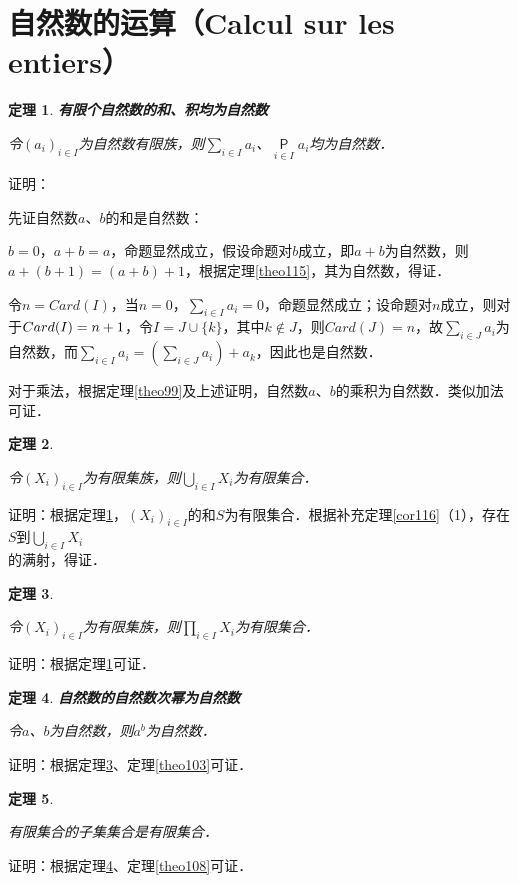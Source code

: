 \documentclass[12pt, a4paper, oneside]{book}
\newtheorem{theo}{定理}
\begin{document}
		\section{自然数的运算（Calcul sur les entiers）}		
			\begin{theo}\label{theo125}
				\textbf{有限个自然数的和、积均为自然数}
				\par
				令$(a_i)_{i\in I}$为自然数有限族，则$\sum\limits_{i\in I}a_i$、$\mathop{\mathsf{P}}\limits_{i\in I}a_i$均为自然数．
			\end{theo}
			证明：
			\par
			先证自然数$a$、$b$的和是自然数：
			\par
			$b=0$，$a+b=a$，命题显然成立，假设命题对$b$成立，即$a+b$为自然数，则$a+(b+1)=(a+b)+1$，根据定理\ref{theo115}，其为自然数，得证．
			\par
			令$n=Card(I)$，当$n=0$，$\sum\limits_{i\in I}a_i=0$，命题显然成立；设命题对$n$成立，则对于$Card(I)\\=n+1$，令$I=J\cup\{k\}$，其中$k\notin J$，则$Card(J)=n$，故$\sum\limits_{i\in J}a_i$为自然数，而$\sum\limits_{i\in I}a_i=(\sum\limits_{i\in J}a_i)+a_k$，因此也是自然数．
			\par
			对于乘法，根据定理\ref{theo99}及上述证明，自然数$a$、$b$的乘积为自然数．类似加法可证．				
						
			\begin{theo}\label{theo126}
				\hfill\par
				令$(X_i)_{i\in I}$为有限集族，则$\bigcup\limits_{i\in I}X_i$为有限集合．
			\end{theo}
			证明：根据定理\ref{theo125}，$(X_i)_{i\in I}$的和$S$为有限集合．根据补充定理\ref{cor116}（1），存在$S$到$\bigcup\limits_{i\in I}X_i$\\的满射，得证．
			
			\begin{theo}\label{theo127}
				\hfill\par
				令$(X_i)_{i\in I}$为有限集族，则$\prod\limits_{i\in I}X_i$为有限集合．
			\end{theo}
			证明：根据定理\ref{theo125}可证．
			
			\begin{theo}\label{theo128}
				\textbf{自然数的自然数次幂为自然数}
				\par
				令$a$、$b$为自然数，则$a^b$为自然数．
			\end{theo}
			证明：根据定理\ref{theo127}、定理\ref{theo103}可证．
			
			\begin{theo}\label{theo129}
				\hfill\par
				有限集合的子集集合是有限集合．
			\end{theo}
			证明：根据定理\ref{theo128}、定理\ref{theo108}可证．
			
\end{document}
